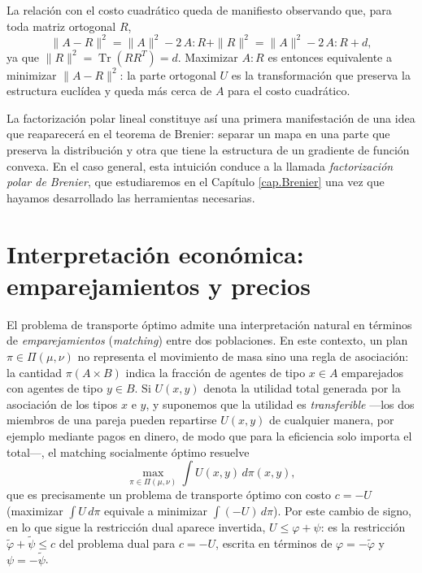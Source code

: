 \documentclass[12pt, a4paper]{amsbook}
\theoremstyle{remark}
\theoremstyle{definition}
\numberwithin{section}{chapter}
\numberwithin{subsection}{section}
\numberwithin{equation}{section}
\numberwithin{figure}{chapter}
\begin{document}
La relación con el costo cuadrático queda de manifiesto observando que, para
toda matriz ortogonal $R$,
\[
\|A-R\|^2=\|A\|^2-2\,A:R+\|R\|^2=\|A\|^2-2\,A:R+d,
\]
ya que $\|R\|^2=\operatorname{Tr}(RR^T)=d$. Maximizar $A:R$ es entonces
equivalente a minimizar $\|A-R\|^2$: la parte ortogonal $U$ es la
transformación que preserva la estructura euclídea y queda más cerca de $A$
para el costo cuadrático.

La factorización polar lineal constituye así una primera manifestación de una
idea que reaparecerá en el teorema de Brenier: separar un mapa en una parte
que preserva la distribución y otra que tiene la estructura de un gradiente
de función convexa. En el caso general, esta intuición conduce a la llamada
\emph{factorización polar de Brenier}, que estudiaremos en el Capítulo \ref{cap.Brenier} una vez que hayamos
desarrollado las herramientas necesarias.

\section{Interpretación económica: emparejamientos y precios}

El problema de transporte óptimo admite una interpretación natural en términos
de \emph{emparejamientos} (\emph{matching}) entre dos poblaciones. En este contexto, un plan
$\pi\in\Pi(\mu,\nu)$ no representa el movimiento de masa sino una regla de
asociación: la cantidad $\pi(A\times B)$ indica la fracción de agentes de
tipo $x\in A$ emparejados con agentes de tipo $y\in B$. Si $U(x,y)$ denota
la utilidad total generada por la asociación de los tipos $x$ e $y$, y
suponemos que la utilidad es \emph{transferible} —los dos miembros de una
pareja pueden repartirse $U(x,y)$ de cualquier manera, por ejemplo mediante
pagos en dinero, de modo que para la eficiencia solo importa el total—, el
matching socialmente óptimo resuelve
\[
\max_{\pi\in\Pi(\mu,\nu)}\int U(x,y)\,d\pi(x,y),
\]
que es precisamente un problema de transporte óptimo con costo $c = -U$
(maximizar $\int U\,d\pi$ equivale a minimizar $\int(-U)\,d\pi$). Por este
cambio de signo, en lo que sigue la restricción dual aparece invertida,
$U\le\varphi+\psi$: es la restricción $\tilde\varphi+\tilde\psi\le c$ del
problema dual para $c=-U$, escrita en términos de
$\varphi=-\tilde\varphi$ y $\psi=-\tilde\psi$.
\end{document}
